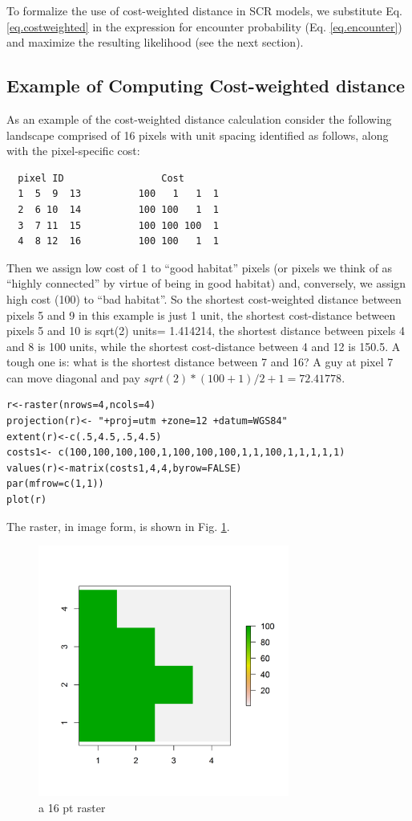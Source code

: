 \documentclass[12pt]{article}
\begin{document}
To formalize the use of cost-weighted distance in SCR models, we
substitute Eq. \ref{eq.costweighted} in the expression for encounter
probability (Eq. \ref{eq.encounter}) and maximize the resulting
likelihood (see the next section).

\subsection{Example of Computing Cost-weighted distance}

As an example of the cost-weighted distance calculation consider the
following landscape comprised of 16 pixels with unit spacing 
identified as follows, along with the pixel-specific cost:
\begin{verbatim}
  pixel ID                 Cost
  1  5  9  13          100   1   1  1
  2  6 10  14          100 100   1  1
  3  7 11  15          100 100 100  1
  4  8 12  16          100 100   1  1 
\end{verbatim}
Then we assign low cost of 1 to ``good habitat'' pixels (or pixels we
think of as ``highly connected'' by virtue of being in good habitat)
and, conversely, we assign high cost (100) to ``bad habitat''. So the
shortest cost-weighted distance between pixels 5 and 9 in this example
is just 1 unit, the shortest cost-distance between pixels 5 and 10 is
sqrt(2) units= 1.414214, the shortest distance between pixels 4 and 8 is 100
units, while the shortest cost-distance between 4 and 12 is 150.5. A
tough one is: what is the shortest distance between 7 and 16? A guy at pixel
7 can move diagonal and pay  $sqrt(2)*(100+1)/2 + 1 =72.41778$.

\begin{verbatim}
r<-raster(nrows=4,ncols=4)
projection(r)<- "+proj=utm +zone=12 +datum=WGS84"
extent(r)<-c(.5,4.5,.5,4.5)
costs1<- c(100,100,100,100,1,100,100,100,1,1,100,1,1,1,1,1)
values(r)<-matrix(costs1,4,4,byrow=FALSE)
par(mfrow=c(1,1))
plot(r)
\end{verbatim}
The raster, in image form, is shown in Fig. \ref{ecoldist.fig.raster}.

\begin{figure}
\begin{center}
\includegraphics[height=3.25in,width=3.25in]{figs/raster_2values}
\end{center}
\caption{a 16 pt raster}
\label{ecoldist.fig.raster}
\end{figure}
\end{document}
